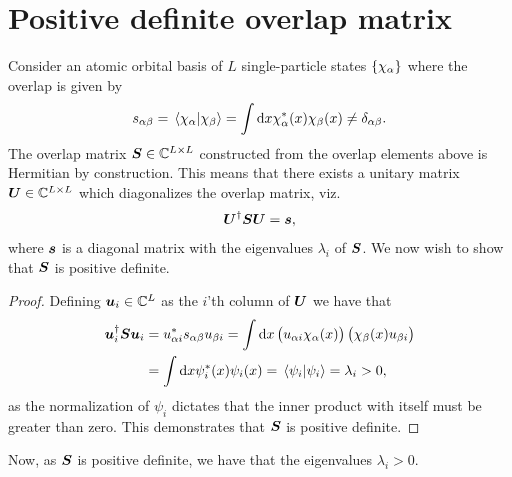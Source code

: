     \section{Positive definite overlap matrix}
        \label{app:positive-definite-overlap}
        Consider an atomic orbital basis of $L$ single-particle states
        $\left\{ \chi_{\alpha} \right\}$ where the overlap is given by
        \begin{align}
            s_{\alpha\beta}
            = \braket*{\chi_{\alpha}}{\chi_{\beta}}
            = \int\dd x \chi^{*}_{\alpha}(x)\chi_{\beta}(x)
            \neq \delta_{\alpha\beta}.
        \end{align}
        The overlap matrix $\boldsymbol{S} \in \mathbb{C}^{L \times L}$ constructed
        from the overlap elements above is Hermitian by construction.
        This means that there exists a unitary matrix $\boldsymbol{U} \in \mathbb{C}^{L
        \times L}$ which diagonalizes the overlap matrix, viz.
        \begin{align}
            \boldsymbol{U}^{\dagger}\boldsymbol{S}\boldsymbol{U}
            = \boldsymbol{s},
        \end{align}
        where $\boldsymbol{s}$ is a diagonal matrix with the eigenvalues $\lambda_i$ of
        $\boldsymbol{S}$.
        We now wish to show that $\boldsymbol{S}$ is positive definite.
        \begin{proof}
            Defining $\boldsymbol{u}_{i} \in \mathbb{C}^{L}$ as the $i$'th column of
            $\boldsymbol{U}$ we have that
            \begin{align}
                \boldsymbol{u}_{i}^{\dagger}\boldsymbol{S}\boldsymbol{u}_i
                &= u^{*}_{\alpha i}
                s_{\alpha\beta}
                u_{\beta i}
                = \int\dd x
                \left( 
                    u_{\alpha i}
                    \chi_{\alpha}(x)
                 \right)
                \left( 
                    \chi_{\beta}(x)
                    u_{\beta i}
                 \right)
                \\
                &=
                \int \dd x
                \psi^{*}_i(x)
                \psi_i(x)
                =
                \braket*{\psi_i}{\psi_i}
                = \lambda_i
                > 0,
            \end{align}
            as the normalization of $\psi_i$ dictates that the inner product with
            itself must be greater than zero.
            This demonstrates that $\boldsymbol{S}$ is positive definite.
        \end{proof}
        Now, as $\boldsymbol{S}$ is positive definite, we have that the eigenvalues
        $\lambda_i > 0$.

